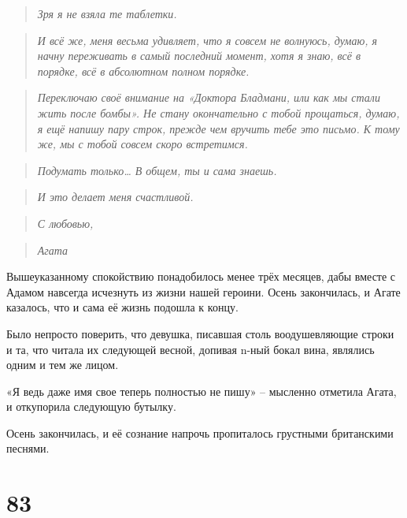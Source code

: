 \documentclass[
  a5paperpaper,
  DIV=11,
  numbers=noendperiod]{scrreprt}
\begin{document}
\begin{quote}
\emph{Зря я не взяла те таблетки.}
\end{quote}

\begin{quote}
\emph{И всё же, меня весьма удивляет, что я совсем не волнуюсь, думаю, я
начну переживать в самый последний момент, хотя я знаю, всё в порядке,
всё в абсолютном полном порядке.}
\end{quote}

\begin{quote}
\emph{Переключаю своё внимание на «Доктора Бладмани, или как мы стали
жить после бомбы». Не стану окончательно с тобой прощаться, думаю, я ещё
напишу пару строк, прежде чем вручить тебе это письмо. К тому же, мы с
тобой совсем скоро встретимся.}
\end{quote}

\begin{quote}
\emph{Подумать только\ldots{} В общем, ты и сама знаешь.}
\end{quote}

\begin{quote}
\emph{И это делает меня счастливой.}
\end{quote}

\begin{quote}
\emph{С любовью,}
\end{quote}

\begin{quote}
\emph{Агата}
\end{quote}

Вышеуказанному спокойствию понадобилось менее трёх месяцев, дабы вместе
с Адамом навсегда исчезнуть из жизни нашей героини. Осень закончилась, и
Агате казалось, что и сама её жизнь подошла к концу.

Было непросто поверить, что девушка, писавшая столь воодушевляющие
строки и та, что читала их следующей весной, допивая n-ный бокал вина,
являлись одним и тем же лицом.

«Я ведь даже имя свое теперь полностью не пишу» -- мысленно отметила
Агата, и откупорила следующую бутылку.

Осень закончилась, и её сознание напрочь пропиталось грустными
британскими песнями.

\section*{83}\label{83}

\end{document}
